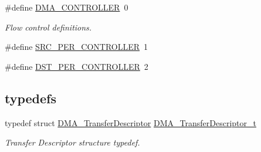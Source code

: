 \begin{DoxyCompactItemize}
\item 
\#define \hyperlink{group___g_p_d_m_a__18_x_x__43_x_x_ga42385ba8b249b55d8a140a7c35f41c35}{D\+M\+A\+\_\+\+C\+O\+N\+T\+R\+O\+L\+L\+ER}~0
\begin{DoxyCompactList}\small\item\em Flow control definitions. \end{DoxyCompactList}\item 
\#define \hyperlink{group___g_p_d_m_a__18_x_x__43_x_x_ga850a296f501c6a30228f8df251b73767}{S\+R\+C\+\_\+\+P\+E\+R\+\_\+\+C\+O\+N\+T\+R\+O\+L\+L\+ER}~1
\item 
\#define \hyperlink{group___g_p_d_m_a__18_x_x__43_x_x_ga09bdacfb969a90a403f99d379c34638c}{D\+S\+T\+\_\+\+P\+E\+R\+\_\+\+C\+O\+N\+T\+R\+O\+L\+L\+ER}~2
\end{DoxyCompactItemize}
\subsection*{\textquotesingle{}typedefs\textquotesingle{}}
\begin{DoxyCompactItemize}
\item 
typedef struct \hyperlink{struct_d_m_a___transfer_descriptor}{D\+M\+A\+\_\+\+Transfer\+Descriptor} \hyperlink{group___g_p_d_m_a__18_x_x__43_x_x_ga23dbdf610f0d1f61ae30a69944bbee55}{D\+M\+A\+\_\+\+Transfer\+Descriptor\+\_\+t}
\begin{DoxyCompactList}\small\item\em Transfer Descriptor structure typedef. \end{DoxyCompactList}\end{DoxyCompactItemize}

